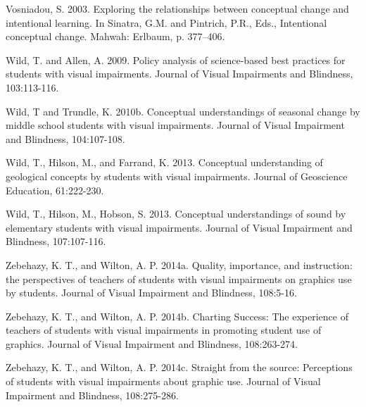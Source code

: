 \documentclass[11.5pt]{sig-alternate} %
\begin{document}
Vosniadou, S. 2003. Exploring the relationships between conceptual change and intentional learning.  In Sinatra, G.M. and Pintrich, P.R., Eds., Intentional conceptual change. Mahwah:  Erlbaum, p. 377–406.

Wild, T. and Allen, A. 2009. Policy analysis of science-based best practices for students with visual impairments.  Journal of Visual Impairments and Blindness, 103:113-116.

Wild, T and Trundle, K. 2010b.  Conceptual understandings of seasonal change 
by middle school students with visual impairments. Journal of Visual Impairment and Blindness, 104:107-108. 

Wild, T., Hilson, M., and Farrand, K.  2013.  Conceptual understanding of 
geological concepts by students with visual impairments.  Journal of Geoscience Education, 61:222-230.

Wild, T., Hilson, M., Hobson, S.  2013.  Conceptual understandings of sound by elementary students with visual impairments.  Journal of Visual Impairment and Blindness, 107:107-116.

Zebehazy, K. T., and Wilton, A. P. 2014a. Quality, importance, and instruction: the perspectives of teachers of students with visual impairments on graphics use by students. Journal of Visual Impairment and Blindness, 108:5-16.

Zebehazy, K. T., and Wilton, A. P. 2014b. Charting Success: The experience of teachers of students with visual impairments in promoting student use of graphics. Journal of Visual Impairment and Blindness, 108:263-274.

Zebehazy, K. T., and Wilton, A. P. 2014c. Straight from the source: Perceptions of students with visual impairments about graphic use. Journal of Visual Impairment and Blindness, 108:275-286.
\clearpage
\leftskip 0in
\parindent 0in 
\end{document}
